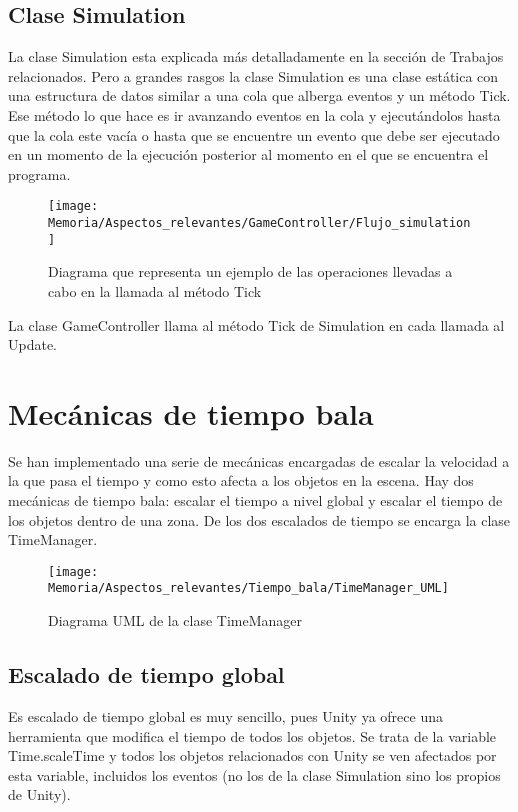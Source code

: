 \subsection{Clase Simulation}
La clase Simulation esta explicada más detalladamente en la sección de Trabajos relacionados. Pero a grandes rasgos la clase Simulation es una clase estática con una estructura de datos similar a una cola que alberga eventos y un método Tick. Ese método lo que hace es ir avanzando eventos en la cola y ejecutándolos hasta que la cola este vacía o hasta que se encuentre un evento que debe ser ejecutado en un momento de la ejecución posterior al momento en el que se encuentra el programa.

\clearpage
\begin{figure}[h]
\texttt{[image: Memoria/Aspectos\_relevantes/GameController/Flujo\_simulation]}
\caption{Diagrama que representa un ejemplo de las operaciones llevadas a cabo en la llamada al método Tick}
\end{figure}

La clase GameController llama al método Tick de Simulation en cada llamada al Update.

\section{Mecánicas de tiempo bala}
Se han implementado una serie de mecánicas encargadas de escalar la velocidad a la que pasa el tiempo y como esto afecta a los objetos en la escena. Hay dos mecánicas de tiempo bala: escalar el tiempo a nivel global y escalar el tiempo de los objetos dentro de una zona. De los dos escalados de tiempo se encarga la clase TimeManager.

\clearpage
\begin{figure}[h]
\texttt{[image: Memoria/Aspectos\_relevantes/Tiempo\_bala/TimeManager\_UML]}
\caption{Diagrama UML de la clase TimeManager}
\end{figure}

\subsection{Escalado de tiempo global}
Es escalado de tiempo global es muy sencillo, pues Unity ya ofrece una herramienta que modifica el tiempo de todos los objetos. Se trata de la variable Time.scaleTime y todos los objetos relacionados con Unity se ven afectados por esta variable, incluidos los eventos (no los de la clase Simulation sino los propios de Unity).

